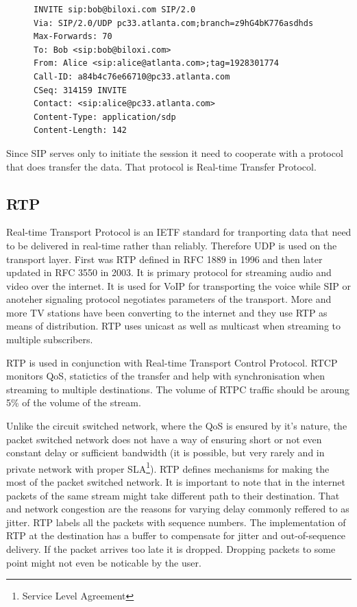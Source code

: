 \begin{figure}[h]
\begin{lstlisting}
INVITE sip:bob@biloxi.com SIP/2.0
Via: SIP/2.0/UDP pc33.atlanta.com;branch=z9hG4bK776asdhds
Max-Forwards: 70
To: Bob <sip:bob@biloxi.com>
From: Alice <sip:alice@atlanta.com>;tag=1928301774
Call-ID: a84b4c76e66710@pc33.atlanta.com
CSeq: 314159 INVITE
Contact: <sip:alice@pc33.atlanta.com>
Content-Type: application/sdp
Content-Length: 142
\end{lstlisting}
\end{figure}

Since SIP serves only to initiate the session it need to cooperate with a protocol that does transfer the data. That protocol is Real-time Transfer Protocol.  

\subsection*{RTP}
Real-time Transport Protocol is an IETF standard for tranporting data that need to be delivered in real-time rather than reliably. Therefore UDP is used on the transport layer. First was RTP defined in RFC 1889 in 1996 and then later updated in RFC 3550 in 2003. It is primary protocol for streaming audio and video over the internet. It is used for VoIP for transporting the voice while SIP or anoteher signaling protocol negotiates parameters of the transport. More and more TV stations have been converting to the internet and they use RTP as means of distribution. RTP uses unicast as well as multicast when streaming to multiple subscribers.

RTP is used in conjunction with Real-time Transport Control Protocol. RTCP monitors QoS, statictics of the transfer and help with synchronisation when streaming to multiple destinations. The volume of RTPC traffic should be aroung 5\% of the volume of the stream.  

Unlike the circuit switched network, where the QoS is ensured by it's nature, the packet switched network does not have a way of ensuring short or not even constant delay or sufficient bandwidth (it is possible, but very rarely and in private network with proper SLA\footnote{Service Level Agreement}). RTP defines mechanisms for making the most of the packet switched network. It is important to note that in the internet packets of the same stream might take different path to their destination. That and network congestion are the reasons for varying delay commonly reffered to as jitter. RTP labels all the packets with sequence numbers. The implementation of RTP at the destination has a buffer to compensate for jitter and out-of-sequence delivery. If the packet arrives too late it is dropped. Dropping packets to some point might not even be noticable by the user. 


